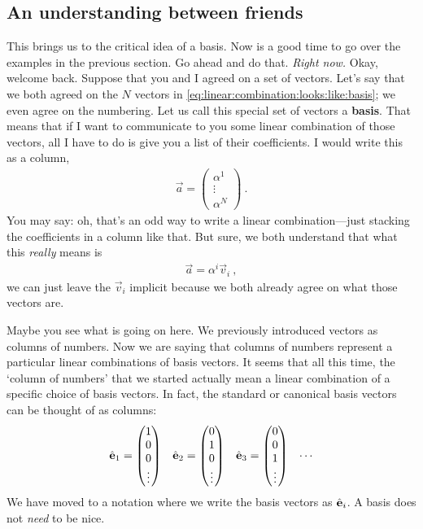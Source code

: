 \documentclass[12pt, oneside]{report}    %
\begin{document}
\subsection{An understanding between friends}
This brings us to the critical idea of a basis. Now is a good time to go over the examples in the previous section. Go ahead and do that. \emph{Right now.} Okay, welcome back. Suppose that you and I agreed on a set of vectors. Let's say that we both agreed on the $N$ vectors in \eqref{eq:linear:combination:looks:like:basis}; we even agree on the numbering. Let us call this special set of vectors a \textbf{basis}. That means that if I want to communicate to you some linear combination of those vectors, all I have to do is give you a list of their coefficients. I would write this as a column,
\begin{align}
    \vec{a} = 
    \begin{pmatrix}
        \alpha^1\\
        \vdots \\
        \alpha ^N
    \end{pmatrix} \ .
\end{align}
You may say: oh, that's an odd way to write a linear combination---just stacking the coefficients in a column like that. But sure, we both understand that what this \emph{really} means is
\begin{align}
    \vec{a} = 
    \alpha^i \vec{v}_i \ ,
\end{align}
we can just leave the $\vec{v}_i$ implicit because we both already agree on what those vectors are. 

Maybe you see what is going on here. We previously introduced vectors as columns of numbers. Now we are saying that columns of numbers represent a particular linear combinations of basis vectors. It seems that all this time, the `column of numbers' that we started actually mean a linear combination of a specific choice of basis vectors. In fact, the standard or canonical basis vectors can be thought of as columns:
\begin{align}
    \hat{\mathbf{e}}_1 &= 
    \begin{pmatrix}
        1\\ 0 \\  0 \\\vdots
    \end{pmatrix}
    &
    \hat{\mathbf{e}}_2 &= 
    \begin{pmatrix}
        0 \\ 1 \\  0 \\\vdots
    \end{pmatrix}
    &
    \hat{\mathbf{e}}_3 &= 
    \begin{pmatrix}
        0 \\ 0 \\  1 \\\vdots
    \end{pmatrix}
    &
    \cdots
    \label{eq:canonical:basis}
\end{align}
We have moved to a notation where we write the basis vectors as $\hat{\mathbf{e}}_i$. A basis does not \emph{need} to be nice. 
\end{document}
